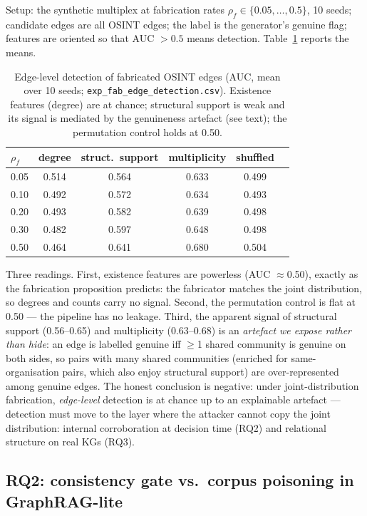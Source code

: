 \documentclass[conference]{IEEEtran}
\begin{document}
Setup: the synthetic multiplex at fabrication rates
$\rho_f\in\{0.05,\dots,0.5\}$, 10 seeds; candidate edges are all OSINT
edges; the label is the generator's genuine flag; features are oriented so
that AUC $>0.5$ means detection. Table~\ref{tab:fab} reports the means.

\begin{table}[t]\centering\footnotesize
\caption{Edge-level detection of fabricated OSINT edges (AUC, mean over 10
seeds; \texttt{exp\_fab\_edge\_detection.csv}). Existence features
(degree) are at chance; structural support is weak and its signal is
mediated by the genuineness artefact (see text); the permutation control
holds at 0.50.}
\label{tab:fab}
\begin{tabular}{lccccc}
\toprule
$\rho_f$ & degree & struct.\ support & multiplicity & shuffled \\
\midrule
0.05 & 0.514 & 0.564 & 0.633 & 0.499 \\
0.10 & 0.492 & 0.572 & 0.634 & 0.493 \\
0.20 & 0.493 & 0.582 & 0.639 & 0.498 \\
0.30 & 0.482 & 0.597 & 0.648 & 0.498 \\
0.50 & 0.464 & 0.641 & 0.680 & 0.504 \\
\bottomrule
\end{tabular}
\end{table}

Three readings. First, existence features are powerless (AUC
$\approx$0.50), exactly as the fabrication proposition predicts: the
fabricator matches the joint distribution, so degrees and counts carry no
signal. Second, the permutation control is flat at 0.50 --- the pipeline
has no leakage. Third, the apparent signal of structural support
(0.56--0.65) and multiplicity (0.63--0.68) is an \emph{artefact we expose
rather than hide}: an edge is labelled genuine iff $\ge$1 shared community
is genuine on both sides, so pairs with many shared communities (enriched
for same-organisation pairs, which also enjoy structural support) are
over-represented among genuine edges. The honest conclusion is negative:
under joint-distribution fabrication, \emph{edge-level} detection is at
chance up to an explainable artefact --- detection must move to the layer
where the attacker cannot copy the joint distribution: internal
corroboration at decision time (RQ2) and relational structure on real KGs
(RQ3).

\subsection{RQ2: consistency gate vs.\ corpus poisoning in GraphRAG-lite}
\label{sec:res-rag}
\end{document}
